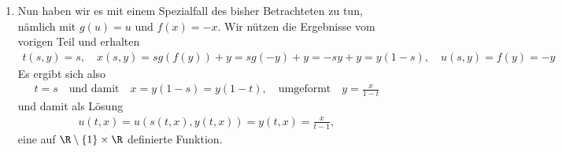 \begin{solution}
\begin{enumerate}[label = (\roman*)]
	\item Nun haben wir es mit einem Spezialfall des bisher Betrachteten zu tun, nämlich mit $g(u) = u$ und $f(x) = -x$. Wir nützen die Ergebnisse vom vorigen Teil und erhalten 
	\begin{align*}
	t(s,y) = s, \quad x(s,y) = sg(f(y)) + y = sg(-y) + y = -sy + y = y(1 - s), \quad u(s,y) = f(y) = -y
	\end{align*}
	Es ergibt sich also
	\begin{align*}
	t = s \quad \text{und damit} \quad x = y(1 - s) = y(1 - t), \quad \text{umgeformt} \quad y = \frac{x}{1 - t}
	\end{align*}
	und damit als Lösung
	\begin{align*}
	u(t,x) = u(s(t,x), y(t,x)) = y(t,x) = \frac{x}{t - 1}, 
	\end{align*}
	eine auf $\R \setminus \{1\} \times \R$ definierte Funktion.
\end{enumerate}

\end{solution}

